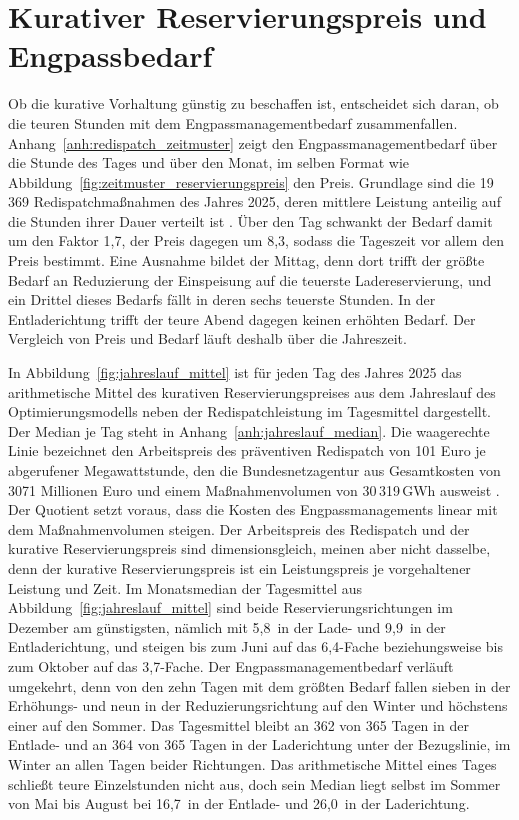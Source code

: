 \section{Kurativer Reservierungspreis und Engpassbedarf}
\label{sec:price_vs_redispatch}

Ob die kurative Vorhaltung günstig zu beschaffen ist, entscheidet sich daran, ob die teuren Stunden mit dem Engpassmanagementbedarf zusammenfallen.
Anhang~\ref{anh:redispatch_zeitmuster} zeigt den Engpassmanagementbedarf über die Stunde des Tages und über den Monat, im selben Format wie Abbildung~\ref{fig:zeitmuster_reservierungspreis} den Preis.
Grundlage sind die 19\,369 Redispatchmaßnahmen des Jahres 2025, deren mittlere Leistung anteilig auf die Stunden ihrer Dauer verteilt ist \cite{netztransparenz_regelenergie_2026}.
Über den Tag schwankt der Bedarf damit um den Faktor 1,7, der Preis dagegen um 8,3, sodass die Tageszeit vor allem den Preis bestimmt.
Eine Ausnahme bildet der Mittag, denn dort trifft der größte Bedarf an Reduzierung der Einspeisung auf die teuerste Ladereservierung, und ein Drittel dieses Bedarfs fällt in deren sechs teuerste Stunden.
In der Entladerichtung trifft der teure Abend dagegen keinen erhöhten Bedarf.
Der Vergleich von Preis und Bedarf läuft deshalb über die Jahreszeit.

In Abbildung~\ref{fig:jahreslauf_mittel} ist für jeden Tag des Jahres 2025 das arithmetische Mittel des kurativen Reservierungspreises aus dem Jahreslauf des Optimierungsmodells neben der Redispatchleistung im Tagesmittel dargestellt.
Der Median je Tag steht in Anhang~\ref{anh:jahreslauf_median}.
Die waagerechte Linie bezeichnet den Arbeitspreis des präventiven Redispatch von 101 Euro je abgerufener Megawattstunde, den die Bundesnetzagentur aus Gesamtkosten von 3071 Millionen Euro und einem Maßnahmenvolumen von 30\,319\,\si{GWh} ausweist \cite{bundesnetzagentur_smard_engpassmanagement_2026}.
Der Quotient setzt voraus, dass die Kosten des Engpassmanagements linear mit dem Maßnahmenvolumen steigen.
Der Arbeitspreis des Redispatch und der kurative Reservierungspreis sind dimensionsgleich, meinen aber nicht dasselbe, denn der kurative Reservierungspreis ist ein Leistungspreis je vorgehaltener Leistung und Zeit.
Im Monatsmedian der Tagesmittel aus Abbildung~\ref{fig:jahreslauf_mittel} sind beide Reservierungsrichtungen im Dezember am günstigsten, nämlich mit 5,8\,\EurMWh{} in der Lade- und 9,9\,\EurMWh{} in der Entladerichtung, und steigen bis zum Juni auf das 6,4-Fache beziehungsweise bis zum Oktober auf das 3,7-Fache.
Der Engpassmanagementbedarf verläuft umgekehrt, denn von den zehn Tagen mit dem größten Bedarf fallen sieben in der Erhöhungs- und neun in der Reduzierungsrichtung auf den Winter und höchstens einer auf den Sommer.
Das Tagesmittel bleibt an 362 von 365 Tagen in der Entlade- und an 364 von 365 Tagen in der Laderichtung unter der Bezugslinie, im Winter an allen Tagen beider Richtungen.
Das arithmetische Mittel eines Tages schließt teure Einzelstunden nicht aus, doch sein Median liegt selbst im Sommer von Mai bis August bei 16,7\,\EurMWh{} in der Entlade- und 26,0\,\EurMWh{} in der Laderichtung.

